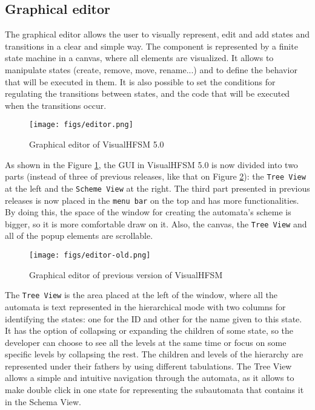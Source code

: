 \documentclass[journal,twoside]{JoPhA}
\begin{document}
\subsection{Graphical editor}

The graphical editor allows the user to visually represent, edit and add states and transitions in a clear and simple way. The component is represented by a finite state machine in a canvas, where all elements are visualized. It allows to manipulate states (create, remove, move, rename...) and to define the behavior that will be executed in them. It is also possible to set the conditions for regulating the transitions between states, and the code that will be executed when the transitions occur.

\begin{figure}[ht!]
\begin{center}
        \texttt{[image: figs/editor.png]}
\end{center}
\caption{Graphical editor of VisualHFSM 5.0}
\label{fig:editor}
\end{figure}

As shown in the Figure \ref{fig:editor}, the GUI in VisualHFSM 5.0 is now divided into two parts (instead of three of previous releases, like that on Figure \ref{fig:editor-old}): the \texttt{Tree View} at the left and the \texttt{Scheme View} at the right. The third part presented in previous releases is now placed in the \texttt{menu bar} on the top and has more functionalities. By doing this, the space of the window for creating the automata’s scheme is bigger, so it is more comfortable draw on it. Also, the canvas, the \texttt{Tree View} and all of the popup elements are scrollable.

\begin{figure}[ht!]
\begin{center}
        \texttt{[image: figs/editor-old.png]}
\end{center}
\caption{Graphical editor of previous version of VisualHFSM}
\label{fig:editor-old}
\end{figure}

The \texttt{Tree View} is the area placed at the left of the window, where all the automata is text represented in the hierarchical mode with two columns for identifying the states: one for the ID and other for the name given to this state. It has the option of collapsing or expanding the children of some state, so the developer can choose to see all the levels at the same time or focus on some specific levels by collapsing the rest. The children and levels of the hierarchy are represented under their fathers by using different tabulations. The Tree View allows a simple and intuitive navigation through the automata, as it allows to make double click in one state for representing the subautomata that contains it in the Schema View.
\end{document}
